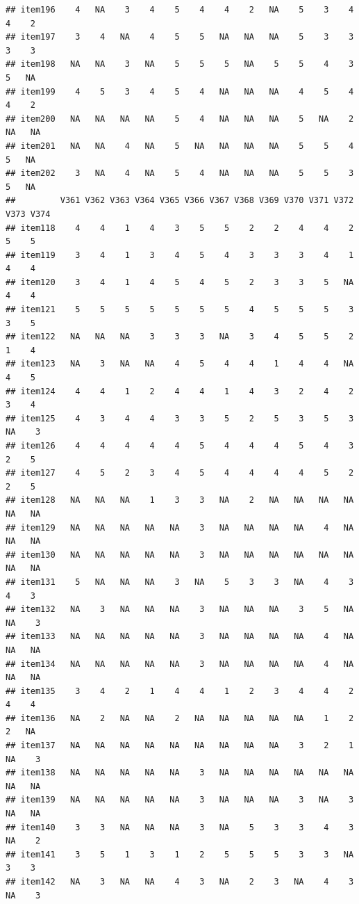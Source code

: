 \documentclass[
  man]{apa6}
\begin{document}
\begin{verbatim}
## item196    4   NA    3    4    5    4    4    2   NA    5    3    4    4    2
## item197    3    4   NA    4    5    5   NA   NA   NA    5    3    3    3    3
## item198   NA   NA    3   NA    5    5    5   NA    5    5    4    3    5   NA
## item199    4    5    3    4    5    4   NA   NA   NA    4    5    4    4    2
## item200   NA   NA   NA   NA    5    4   NA   NA   NA    5   NA    2   NA   NA
## item201   NA   NA    4   NA    5   NA   NA   NA   NA    5    5    4    5   NA
## item202    3   NA    4   NA    5    4   NA   NA   NA    5    5    3    5   NA
##         V361 V362 V363 V364 V365 V366 V367 V368 V369 V370 V371 V372 V373 V374
## item118    4    4    1    4    3    5    5    2    2    4    4    2    5    5
## item119    3    4    1    3    4    5    4    3    3    3    4    1    4    4
## item120    3    4    1    4    5    4    5    2    3    3    5   NA    4    4
## item121    5    5    5    5    5    5    5    4    5    5    5    3    3    5
## item122   NA   NA   NA    3    3    3   NA    3    4    5    5    2    1    4
## item123   NA    3   NA   NA    4    5    4    4    1    4    4   NA    4    5
## item124    4    4    1    2    4    4    1    4    3    2    4    2    3    4
## item125    4    3    4    4    3    3    5    2    5    3    5    3   NA    3
## item126    4    4    4    4    4    5    4    4    4    5    4    3    2    5
## item127    4    5    2    3    4    5    4    4    4    4    5    2    2    5
## item128   NA   NA   NA    1    3    3   NA    2   NA   NA   NA   NA   NA   NA
## item129   NA   NA   NA   NA   NA    3   NA   NA   NA   NA    4   NA   NA   NA
## item130   NA   NA   NA   NA   NA    3   NA   NA   NA   NA   NA   NA   NA   NA
## item131    5   NA   NA   NA    3   NA    5    3    3   NA    4    3    4    3
## item132   NA    3   NA   NA   NA    3   NA   NA   NA    3    5   NA   NA    3
## item133   NA   NA   NA   NA   NA    3   NA   NA   NA   NA    4   NA   NA   NA
## item134   NA   NA   NA   NA   NA    3   NA   NA   NA   NA    4   NA   NA   NA
## item135    3    4    2    1    4    4    1    2    3    4    4    2    4    4
## item136   NA    2   NA   NA    2   NA   NA   NA   NA   NA    1    2    2   NA
## item137   NA   NA   NA   NA   NA   NA   NA   NA   NA    3    2    1   NA    3
## item138   NA   NA   NA   NA   NA    3   NA   NA   NA   NA   NA   NA   NA   NA
## item139   NA   NA   NA   NA   NA    3   NA   NA   NA    3   NA    3   NA   NA
## item140    3    3   NA   NA   NA    3   NA    5    3    3    4    3   NA    2
## item141    3    5    1    3    1    2    5    5    5    3    3   NA    3    3
## item142   NA    3   NA   NA    4    3   NA    2    3   NA    4    3   NA    3

\end{verbatim}
\end{document}

